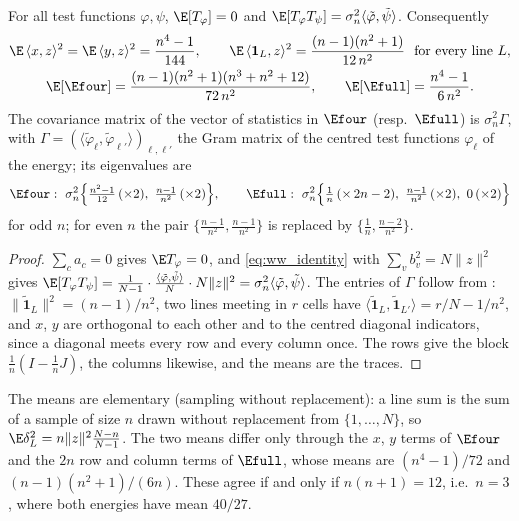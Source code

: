 \begin{proposition}
\label{prop:random_energy_moments}
For all test functions $\varphi,\psi$, $\E[T_\varphi]=0$ and $\E[T_\varphi T_\psi]=\sigma_n^2\langle\tilde\varphi,\tilde\psi\rangle$.
Consequently
\begin{gather}
\E\,\langle x,z\rangle^2=\E\,\langle y,z\rangle^2=\frac{n^4-1}{144},\qquad
\E\,\langle\mathbf 1_L,z\rangle^2=\frac{(n-1)(n^2+1)}{12\,n^2}\ \text{ for every line }L,
\label{eq:single_terms}\\
\E[\Efour]=\frac{(n-1)(n^2+1)(n^3+n^2+12)}{72\,n^2},\qquad
\E[\Efull]=\frac{n^4-1}{6\,n^2}.
\label{eq:mean_low}
\end{gather}
The covariance matrix of the vector of statistics in $\Efour$ (resp.\ $\Efull$) is $\sigma_n^2\Gamma$, with $\Gamma=(\langle\tilde\varphi_\ell,\tilde\varphi_{\ell'}\rangle)_{\ell,\ell'}$ the Gram matrix of the centred test functions $\varphi_\ell$ of the energy; its eigenvalues are
\begin{equation}
\Efour:\ \sigma_n^2\Bigl\{\tfrac{n^2-1}{12}\,(\times2),\ \tfrac{n-1}{n^2}\,(\times2)\Bigr\},
\qquad
\Efull:\ \sigma_n^2\Bigl\{\tfrac1n\,(\times\,2n-2),\ \tfrac{n-1}{n^2}\,(\times2),\ 0\,(\times2)\Bigr\}
\label{eq:weights}
\end{equation}
for odd $n$; for even $n$ the pair $\{\tfrac{n-1}{n^2},\tfrac{n-1}{n^2}\}$ is replaced by $\{\tfrac1n,\tfrac{n-2}{n^2}\}$.
\end{proposition}

\begin{proof}
$\sum_ca_c=0$ gives $\E T_\varphi=0$, and \eqref{eq:ww_identity} with $\sum_vb_v^2=N\|z\|^2$ gives $\E[T_\varphi T_\psi]=\frac1{N-1}\cdot\frac{\langle\tilde\varphi,\tilde\psi\rangle}{N}\cdot N\|z\|^2=\sigma_n^2\langle\tilde\varphi,\tilde\psi\rangle$.
The entries of $\Gamma$ follow from : $\|\tilde{\mathbf 1}_L\|^2=(n-1)/n^2$, two lines meeting in $r$ cells have $\langle\tilde{\mathbf 1}_L,\tilde{\mathbf 1}_{L'}\rangle=r/N-1/n^2$, and $x$, $y$ are orthogonal to each other and to the centred diagonal indicators, since a diagonal meets every row and every column once.
The rows give the block $\frac1n(I-\frac1nJ)$, the columns likewise, and the means are the traces.
\end{proof}

The means are elementary (sampling without replacement): a line sum is the sum of a sample of size $n$ drawn without replacement from $\{1,\dots,N\}$, so $\E\delta_L^2=n\|z\|^2\frac{N-n}{N-1}$.
The two means differ only through the $x$, $y$ terms of $\Efour$ and the $2n$ row and column terms of $\Efull$, whose means are $(n^4-1)/72$ and $(n-1)(n^2+1)/(6n)$.
These agree if and only if $n(n+1)=12$, i.e.\ $n=3$, where both energies have mean $40/27$.

